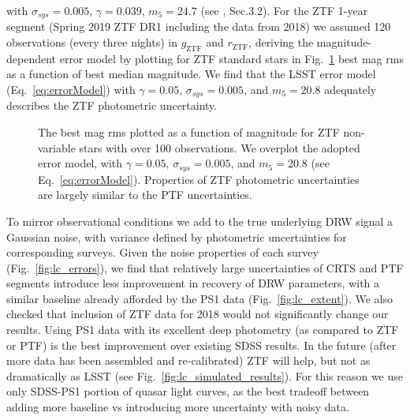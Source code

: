 \documentclass[twocolumn]{aastex62}
\begin{document}
with  $\sigma_{sys} = 0.005$, $\gamma=0.039$, $m_{5} = 24.7$ (see \citealt{ivezic2019}, Sec.3.2).
For the ZTF 1-year segment (Spring 2019 ZTF DR1 including the data from 2018) we assumed 120 observations (every three nights) in $g_{\mathrm{ZTF}}$ and $r_{\mathrm{ZTF}}$, deriving the magnitude-dependent error model by plotting for ZTF standard stars in Fig.~\ref{fig:ztf_errors} best mag rms as a function of best median magnitude. We find that the LSST error model (Eq.~\ref{eq:errorModel}) with $\gamma = 0.05$, $\sigma_{sys} = 0.005 $, and $m_{5} = 20.8$ adequately describes the ZTF photometric uncertainty. 

\begin{figure*}%
\caption{Simulated well-sampled underlying DRW process - one of `master' light curves ($\tau=575$d, SF$_{\infty} = 0.2$ mag, 4 points per day) shown with  small black dots. To simulate observations, the cadence is degraded (subsampled) to match the ground-based cadence corresponding to real quasar data from SDSS (red), PS1 (green) segments, and simulated LSST (blue) epochs (here we use SDSS-PS1 epochs for quasar dbID=3537034). The orange `error snake' is an envelope marking the standard deviation of the fit to the data using a Gaussian process  with DRW kernel (Sec.~\ref{sec:simulation}).}
\label{fig:lc_simulated}
\end{figure*} 

\begin{figure}%
\caption{The best mag rms plotted as a function of magnitude for ZTF non-variable stars with over 100 observations. We overplot the adopted error model, with $\gamma = 0.05$, $\sigma_{sys} = 0.005 $, and $m_{5} = 20.8$ (see Eq.~\ref{eq:errorModel}). Properties of ZTF photometric uncertainties are largely similar to the PTF uncertainties.}
\label{fig:ztf_errors}
\end{figure} 


To mirror observational conditions we add to the true underlying DRW signal a Gaussian noise, with variance defined by photometric uncertainties for corresponding surveys. Given the noise properties of each survey (Fig.~\ref{fig:lc_errors}), we find that relatively large uncertainties of CRTS and PTF segments introduce less improvement in recovery of DRW parameters, with a  similar baseline already afforded by the PS1 data (Fig.~\ref{fig:lc_extent}).  We also checked that inclusion of ZTF data for 2018 would not significantly change our results. Using PS1 data with its excellent  deep photometry (as compared to ZTF or PTF) is the best improvement over existing SDSS results.  In the future (after more data has been assembled and re-calibrated) ZTF will help, but not as dramatically as LSST (see Fig.~\ref{fig:lc_simulated_results}).  For this reason we use only SDSS-PS1 portion of quasar light curves, as the best tradeoff between adding more baseline vs introducing more uncertainty with noisy data.
\end{document}
